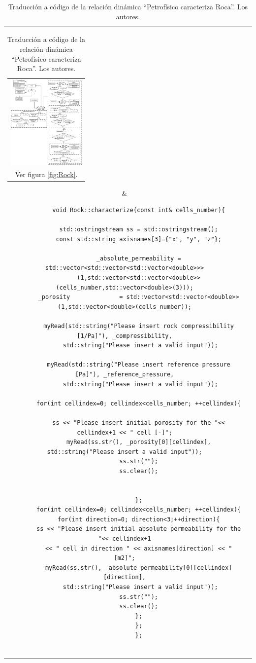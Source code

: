 \begin{table}[h]
	\centering
	\begin{tabular}{cc}
		\parbox[c]{5em}{
			\begin{tabular}[c]{@{}c@{}}\includegraphics[width=1.5in]{Fig/Rock.pdf}\\ Ver figura \ref{fig:Rock}.\end{tabular}
		}
	 &
	\begin{tiny}
		\begin{lstlisting}
		void Rock::characterize(const int& cells_number){
		
		std::ostringstream ss = std::ostringstream();
		const std::string axisnames[3]={"x", "y", "z"};
		
		_absolute_permeability = std::vector<std::vector<std::vector<double>>>
		(1,std::vector<std::vector<double>>(cells_number,std::vector<double>(3)));
		_porosity              = std::vector<std::vector<double>>(1,std::vector<double>(cells_number));
		
		myRead(std::string("Please insert rock compressibility [1/Pa]"), _compressibility,
		 std::string("Please insert a valid input"));
		
		myRead(std::string("Please insert reference pressure [Pa]"), _reference_pressure,
		 std::string("Please insert a valid input"));
		
		for(int cellindex=0; cellindex<cells_number; ++cellindex){
		
		ss << "Please insert initial porosity for the "<< cellindex+1 << " cell [-]";
		myRead(ss.str(), _porosity[0][cellindex], std::string("Please insert a valid input"));
		ss.str("");
		ss.clear();
		
		
		};
		for(int cellindex=0; cellindex<cells_number; ++cellindex){
		for(int direction=0; direction<3;++direction){
		ss << "Please insert initial absolute permeability for the "<< cellindex+1
		<< " cell in direction " << axisnames[direction] << " [m2]";
		myRead(ss.str(), _absolute_permeability[0][cellindex][direction],
		 std::string("Please insert a valid input"));
		ss.str("");
		ss.clear();
		};
		};
		};
		
		\end{lstlisting}
	\end{tiny}
	\end{tabular}
\label{tab:RockCharacterizeCode}
\caption[Traducción a código de la relación dinámica ``Petrofísico caracteriza Roca''.]{Traducción a código de la relación dinámica ``Petrofísico caracteriza Roca''. Los autores.}
\end{table}

